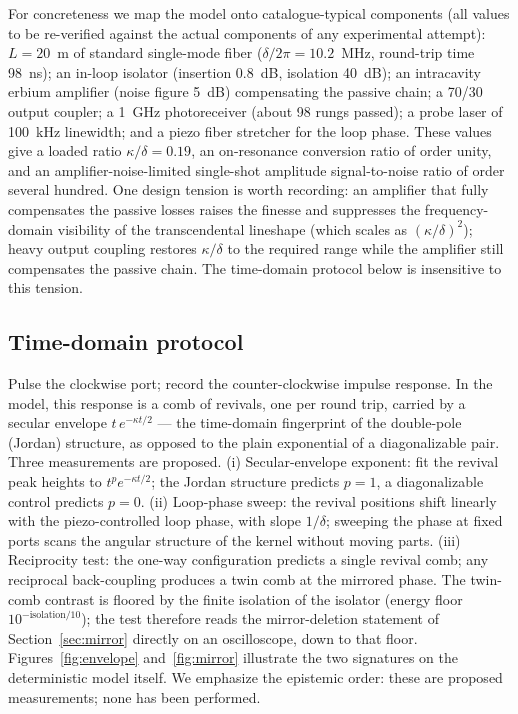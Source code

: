 \documentclass[11pt,a4paper]{article}
\begin{document}
For concreteness we map the model onto catalogue-typical components (all values
to be re-verified against the actual components of any experimental attempt):
$L = 20$~m of standard single-mode fiber ($\delta / 2\pi = 10.2$~MHz,
round-trip time 98~ns); an in-loop isolator (insertion 0.8~dB, isolation
40~dB); an intracavity erbium amplifier (noise figure 5~dB) compensating the
passive chain; a 70/30 output coupler; a 1~GHz photoreceiver (about 98 rungs
passed); a probe laser of 100~kHz linewidth; and a piezo fiber stretcher for
the loop phase. These values give a loaded ratio $\kappa/\delta = 0.19$, an
on-resonance conversion ratio of order unity, and an amplifier-noise-limited
single-shot amplitude signal-to-noise ratio of order several hundred. One
design tension is worth recording: an amplifier that fully compensates the
passive losses raises the finesse and suppresses the frequency-domain
visibility of the transcendental lineshape (which scales as
$(\kappa/\delta)^2$); heavy output coupling restores $\kappa/\delta$ to the
required range while the amplifier still compensates the passive chain. The
time-domain protocol below is insensitive to this tension.

\subsection{Time-domain protocol}
\label{sec:protocol}

Pulse the clockwise port; record the counter-clockwise impulse response. In the
model, this response is a comb of revivals, one per round trip, carried by a
secular envelope $t\, e^{-\kappa t / 2}$ --- the time-domain fingerprint of the
double-pole (Jordan) structure, as opposed to the plain exponential of a
diagonalizable pair. Three measurements are proposed. (i) Secular-envelope
exponent: fit the revival peak heights to $t^p e^{-\kappa t / 2}$; the Jordan
structure predicts $p = 1$, a diagonalizable control predicts $p = 0$.
(ii) Loop-phase sweep: the revival positions shift linearly with the
piezo-controlled loop phase, with slope $1/\delta$; sweeping the phase at fixed
ports scans the angular structure of the kernel without moving parts.
(iii) Reciprocity test: the one-way configuration predicts a single revival
comb; any reciprocal back-coupling produces a twin comb at the mirrored phase.
The twin-comb contrast is floored by the finite isolation of the isolator
(energy floor $10^{-\mathrm{isolation}/10}$); the test therefore reads the
mirror-deletion statement of Section~\ref{sec:mirror} directly on an
oscilloscope, down to that floor. Figures~\ref{fig:envelope}
and~\ref{fig:mirror} illustrate the two signatures on the deterministic model
itself. We emphasize the epistemic order: these are
proposed measurements; none has been performed.
\end{document}
